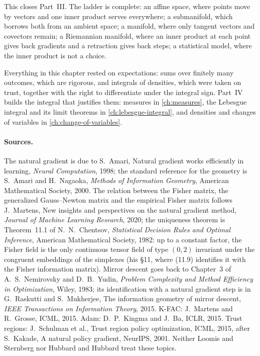 \begin{notechapter}
This closes Part~III. The ladder is complete: an affine space, where
points move by vectors and one inner product serves everywhere; a
submanifold, which borrows both from an ambient space; a manifold, where
only tangent vectors and covectors remain; a Riemannian manifold, where
an inner product at each point gives back gradients and a retraction
gives back steps; a statistical model, where the inner product is not a
choice.

Everything in this chapter rested on expectations: sums over finitely
many outcomes, which are rigorous, and integrals of densities, which
were taken on trust, together with the right to differentiate under the
integral sign. Part~IV builds the integral that justifies them:
measures in \cref{ch:measures}, the Lebesgue integral and its limit
theorems in \cref{ch:lebesgue-integral}, and densities and changes of
variables in \cref{ch:change-of-variables}.

\paragraph{Sources.} The natural gradient is due to S.~Amari, Natural
gradient works efficiently in learning, \emph{Neural Computation}, 1998;
the standard reference for the geometry is S.~Amari and H.~Nagaoka,
\emph{Methods of Information Geometry}, American Mathematical Society,
2000. The relation between the Fisher matrix, the generalized
Gauss--Newton matrix and the empirical Fisher matrix follows
J.~Martens, New insights and perspectives on the natural gradient
method, \emph{Journal of Machine Learning Research}, 2020; the
uniqueness theorem is Theorem~11.1 of N.~N.~Chentsov, \emph{Statistical
Decision Rules and Optimal Inference}, American Mathematical Society,
1982: up to a constant factor, the Fisher field is the only continuous
tensor field of type $(0,2)$ invariant under the congruent embeddings
of the simplexes (his \S11, where (11.9) identifies it with the Fisher
information matrix). Mirror descent goes back to Chapter~3 of
A.~S.~Nemirovsky and D.~B.~Yudin, \emph{Problem Complexity and Method
Efficiency in Optimization}, Wiley, 1983; its
identification with a natural gradient step is in G.~Raskutti and
S.~Mukherjee, The information geometry of mirror descent, \emph{IEEE
Transactions on Information Theory}, 2015. K-FAC: J.~Martens and
R.~Grosse, ICML, 2015. Adam: D.~P.~Kingma and J.~Ba, ICLR, 2015. Trust
regions: J.~Schulman et al., Trust region policy optimization, ICML,
2015, after S.~Kakade, A natural policy gradient, NeurIPS, 2001. Neither
Loomis and Sternberg nor Hubbard and Hubbard treat these topics.


\end{notechapter}

